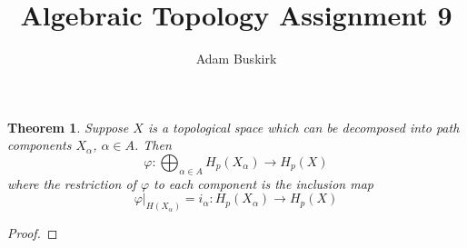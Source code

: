 \documentclass{article}
\title{Algebraic Topology Assignment 9}
\author{Adam Buskirk}
\newtheorem{theorem}{Theorem}
\theoremstyle{definition}
\begin{document}
\maketitle

\begin{theorem}
Suppose $X$ is a topological space which can be decomposed into
path components
$X_\alpha$, $\alpha \in A$. Then 
\[ \varphi : \bigoplus_{\alpha \in A} H_p (X_\alpha) \to H_p (X) \]
where the restriction of $\varphi$ to each component is the inclusion map
\[ \varphi|_{H(X_\alpha)} = i_\alpha : H_p(X_\alpha) \to H_p(X) \]

\end{theorem}
\begin{proof}

\end{proof}
\end{document}
